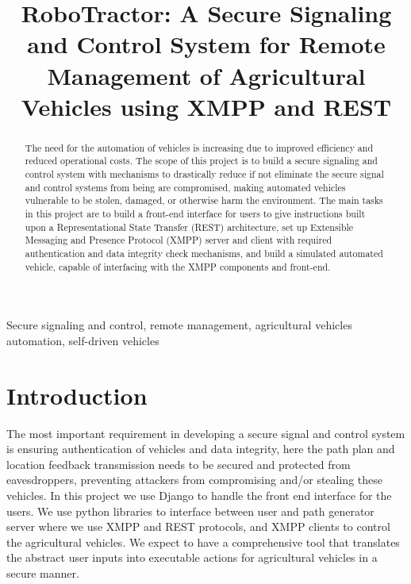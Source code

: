 \documentclass[conference,12pt]{IEEEtran}
\begin{document}
%
\title{RoboTractor: A Secure Signaling and Control System for Remote Management of Agricultural Vehicles using XMPP and REST}

\author{
\and
{}
\and
{}
}
\maketitle


\begin{abstract}
The need for the automation of vehicles is increasing due to
improved efficiency and reduced operational costs. The scope of this
project is to build a secure signaling and control system with
mechanisms to drastically reduce if not eliminate the secure signal
and control systems from being are compromised, making automated
vehicles vulnerable to be stolen, damaged, or otherwise harm the
environment. The main tasks in this project are to build a front-end
interface for users to give instructions built upon a Representational
State Transfer (REST) architecture, set up Extensible Messaging and
Presence Protocol (XMPP) server and client with required
authentication and data integrity check mechanisms, and build a
simulated automated vehicle, capable of interfacing with the XMPP
components and front-end.
\end{abstract}

\begin{IEEEkeywords}
    Secure signaling and control, remote management, agricultural vehicles automation, self-driven vehicles
\end{IEEEkeywords}

\section{Introduction}
The most important requirement in developing a secure signal and control
system is ensuring authentication of vehicles and data integrity, here
the path plan and location feedback transmission needs to be secured
and protected from eavesdroppers, preventing attackers from
compromising and/or stealing these vehicles. In this project we use
Django to handle the front end interface for the users. We use python
libraries to interface between user and path generator server where we
use XMPP and REST protocols, and XMPP clients to control the
agricultural vehicles. We expect to have a comprehensive tool that
translates the abstract user inputs into executable actions for
agricultural vehicles in a secure manner.
\end{document}
